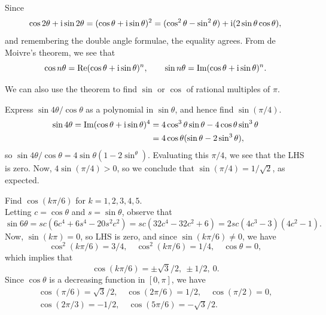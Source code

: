 \documentclass[letter-paper]{tufte-book}
\newenvironment{example}[1][Example]{\begin{trivlist}
\item[\hskip \labelsep {\bfseries #1}]}{\end{trivlist}}
\newcommand{\zi}{{\rm i}}
\newcommand\Real{\mbox{Re}} %
\newcommand\Imag{\mbox{Im}} %
\begin{document}
\begin{example}
  Since  
	\begin{equation*}
		\cos2\theta+\zi\sin2\theta=(\cos\theta+\zi\sin\theta)^2
		=(\cos^2\theta-\sin^2\theta)+\zi(2\sin\theta\cos\theta),
	\end{equation*}
	and remembering the double angle formulae, the equality agrees. From de
	Moivre's theorem, we see that
	\begin{equation*}
		\cos n\theta=\Real(\cos\theta+\zi\sin\theta)^n,\qquad
		\sin n\theta=\Imag(\cos\theta+\zi\sin\theta)^n.
	\end{equation*}
\end{example}

We can also use the theorem to find $\sin$ or $\cos$ of rational multiples of
$\pi$.
\begin{example}
	Express $\sin4\theta/\cos\theta$ as a polynomial in $\sin\theta$, and hence
	find $\sin(\pi/4)$.
	\begin{align*}
		\sin4\theta = \Imag(\cos\theta+\zi\sin\theta)^4
		&= 4\cos^3\theta\sin\theta-4\cos\theta\sin^3\theta\\
		&= 4\cos\theta(\sin\theta-2\sin^3\theta),
	\end{align*}
	so $\sin4\theta/\cos\theta=4\sin\theta(1-2\sin^\theta)$. Evaluating this
	$\pi/4$, we see that the LHS is zero. Now, $4\sin(\pi/4)>0$, so we conclude
	that $\sin(\pi/4)=1/\sqrt{2}$, as expected.
\end{example}
\begin{example}
	Find $\cos(k\pi/6)$ for $k=1,2,3,4,5$.\\
	
	Letting $c=\cos\theta$ and $s=\sin\theta$, observe that
	\begin{equation*}
		\sin6\theta=sc(6c^4+6s^4-20s^2c^2)=sc(32c^4-32c^2+6)
		=2sc(4c^3-3)(4c^2-1).
	\end{equation*}
	Now, $\sin(k\pi)=0$, so LHS is zero, and since $\sin(k\pi/6)\neq0$, we have
	\begin{equation*}
		\cos^2(k\pi/6)=3/4,\quad \cos^2(k\pi/6)=1/4,\quad \cos\theta=0,
	\end{equation*}
	which implies that
	\begin{equation*}
	  \cos(k\pi/6)=\pm\sqrt{3}/2,\ \pm1/2,\ 0.
	\end{equation*}
	Since $\cos\theta$ is a decreasing function in $[0,\pi]$, we have
	\begin{align*}
		\cos(\pi/6)=\sqrt{3}/2,\quad \cos(2\pi/6)=1/2,\quad \cos(\pi/2)=0,\\
		\cos(2\pi/3)=-1/2,\quad \cos(5\pi/6)=-\sqrt{3}/2.
	\end{align*}
\end{example}
\end{document}

